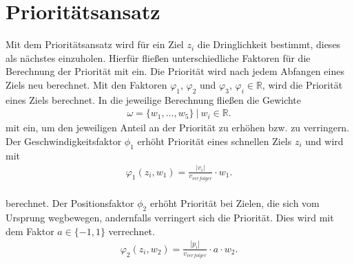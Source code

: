 \documentclass[german,version-2019-11]{uzl-thesis}
\begin{document}
\section{Prioritätsansatz}

Mit dem Prioritätsansatz wird für ein Ziel $z_i$ die Dringlichkeit bestimmt, dieses als nächstes einzuholen. Hierfür fließen unterschiedliche Faktoren für die Berechnung der Priorität mit ein. Die Priorität wird nach jedem Abfangen eines Ziels neu berechnet. Mit den Faktoren $\varphi_1$, $\varphi_2$ und $\varphi_3$, $\varphi_i\in\mathbb{R}$, wird die Priorität eines Ziels berechnet. In die jeweilige Berechnung fließen die Gewichte
\begin{align*}
\omega = \{w_1,...,w_5\}~|~w_i \in\mathbb{R}.
\end{align*}
mit ein, um den jeweiligen Anteil an der Priorität zu erhöhen bzw. zu verringern.\\
Der Geschwindigkeitsfaktor $\phi_1$ erhöht Priorität eines schnellen Ziels $z_i$ und wird mit 
\begin{align}
\varphi_1(z_i, w_1) = \frac{|v_i|}{v_{verfolger}}\cdot w_1.
\end{align}\\
berechnet.
\label{def:FaktorPos}
Der Positionsfaktor $\phi_2$ erhöht Priorität bei Zielen, die sich vom Ursprung wegbewegen, andernfalls verringert sich die Priorität. Dies wird mit dem Faktor $a\in\{-1,1\}$ verrechnet.
\begin{align}
\varphi_2(z_i, w_2) = \frac{|p_i|}{v_{verfolger}}\cdot a \cdot w_2.
\end{align}\\
\end{document}
